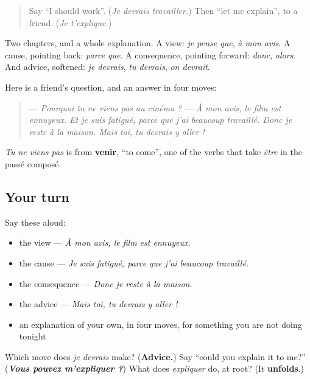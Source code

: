 \label{lesson:FR-C261-revision-explication}



\begin{quote}
Say \textquotedblleft{}I should work\textquotedblright{}. (\emph{Je devrais travailler.}) Then \textquotedblleft{}let me explain\textquotedblright{}, to a friend. (\emph{Je t'explique.})
\end{quote}

\begin{grammarlens}[title={What you've built}]
Two chapters, and a whole explanation. A view: \emph{je pense que}, \emph{à mon avis}. A cause, pointing back: \emph{parce que}. A consequence, pointing forward: \emph{donc}, \emph{alors}. And advice, softened: \emph{je devrais}, \emph{tu devrais}, \emph{on devrait}.

Here is a friend's question, and an answer in four moves:

\begin{quote}
— \emph{Pourquoi tu ne viens pas au cinéma ?} — \emph{À mon avis, le film est ennuyeux. Et je suis fatigué, parce que j'ai beaucoup travaillé. Donc je reste à la maison. Mais toi, tu devrais y aller !}
\end{quote}

\emph{Tu ne viens pas} is from \textbf{venir}, \textquotedblleft{}to come\textquotedblright{}, one of the verbs that take \emph{être} in the passé composé.
\end{grammarlens}

\subsection*{Your turn}
Say these aloud:

\begin{itemize}
\raggedright
  \item the view — \emph{À mon avis, le film est ennuyeux.}
  \item the cause — \emph{Je suis fatigué, parce que j'ai beaucoup travaillé.}
  \item the consequence — \emph{Donc je reste à la maison.}
  \item the advice — \emph{Mais toi, tu devrais y aller !}
  \item an explanation of your own, in four moves, for something you are not doing tonight
\end{itemize}

\begin{tcolorbox}[breakable,colback=teal!4,colframe=teal!35!black,title={Before you move on}]
Which move does \emph{je devrais} make? (\textbf{Advice.}) Say \textquotedblleft{}could you explain it to me?\textquotedblright{} (\emph{\textbf{Vous pouvez m'expliquer ?}}) What does \emph{expliquer} do, at root? (It \textbf{unfolds}.)
\end{tcolorbox}
